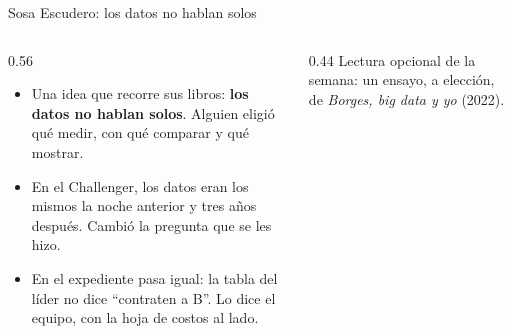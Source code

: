\documentclass{beamer}
\begin{document}
\begin{frame}{Sosa Escudero: los datos no hablan solos}
\begin{columns}[T]
\begin{column}{0.56\textwidth}
\begin{itemize}\itemsep6pt
  \item Una idea que recorre sus libros: \textbf{los datos no hablan solos}. Alguien eligió qué medir, con qué comparar y qué mostrar.
  \item En el Challenger, los datos eran los mismos la noche anterior y tres años después. Cambió la pregunta que se les hizo.
  \item En el expediente pasa igual: la tabla del líder no dice ``contraten a B''. Lo dice el equipo, con la hoja de costos al lado.
\end{itemize}
\end{column}
\begin{column}{0.44\textwidth}
\medskip
\footnotesize Lectura opcional de la semana: un ensayo, a elección, de \emph{Borges, big data y yo} (2022).
\end{column}
\end{columns}
\end{frame}
\end{document}
